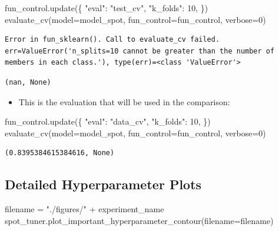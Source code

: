 \documentclass[
  letterpaper,
  DIV=11,
  numbers=noendperiod]{scrreprt}
\newenvironment{Shaded}{\begin{snugshade}}{\end{snugshade}}
\newcommand{\DecValTok}[1]{\textcolor[rgb]{0.68,0.00,0.00}{#1}}
\newcommand{\NormalTok}[1]{\textcolor[rgb]{0.00,0.23,0.31}{#1}}
\newcommand{\OperatorTok}[1]{\textcolor[rgb]{0.37,0.37,0.37}{#1}}
\newcommand{\StringTok}[1]{\textcolor[rgb]{0.13,0.47,0.30}{#1}}
\providecommand{\tightlist}{%
  \setlength{\itemsep}{0pt}\setlength{\parskip}{0pt}}\usepackage{longtable,booktabs,array}
\begin{document}
\begin{Shaded}
\begin{Highlighting}[]
\NormalTok{fun\_control.update(\{}
     \StringTok{"eval"}\NormalTok{: }\StringTok{"test\_cv"}\NormalTok{,}
     \StringTok{"k\_folds"}\NormalTok{: }\DecValTok{10}\NormalTok{,}
\NormalTok{\})}
\NormalTok{evaluate\_cv(model}\OperatorTok{=}\NormalTok{model\_spot, fun\_control}\OperatorTok{=}\NormalTok{fun\_control, verbose}\OperatorTok{=}\DecValTok{0}\NormalTok{)}
\end{Highlighting}
\end{Shaded}

\begin{verbatim}
Error in fun_sklearn(). Call to evaluate_cv failed. err=ValueError('n_splits=10 cannot be greater than the number of members in each class.'), type(err)=<class 'ValueError'>
\end{verbatim}

\begin{verbatim}
(nan, None)
\end{verbatim}

\begin{itemize}
\tightlist
\item
  This is the evaluation that will be used in the comparison:
\end{itemize}

\begin{Shaded}
\begin{Highlighting}[]
\NormalTok{fun\_control.update(\{}
     \StringTok{"eval"}\NormalTok{: }\StringTok{"data\_cv"}\NormalTok{,}
     \StringTok{"k\_folds"}\NormalTok{: }\DecValTok{10}\NormalTok{,}
\NormalTok{\})}
\NormalTok{evaluate\_cv(model}\OperatorTok{=}\NormalTok{model\_spot, fun\_control}\OperatorTok{=}\NormalTok{fun\_control, verbose}\OperatorTok{=}\DecValTok{0}\NormalTok{)}
\end{Highlighting}
\end{Shaded}

\begin{verbatim}
(0.8395384615384616, None)
\end{verbatim}

\hypertarget{detailed-hyperparameter-plots-2}{%
\subsection{Detailed Hyperparameter
Plots}\label{detailed-hyperparameter-plots-2}}

\begin{Shaded}
\begin{Highlighting}[]
\NormalTok{filename }\OperatorTok{=} \StringTok{"./figures/"} \OperatorTok{+}\NormalTok{ experiment\_name}
\NormalTok{spot\_tuner.plot\_important\_hyperparameter\_contour(filename}\OperatorTok{=}\NormalTok{filename)}
\end{Highlighting}
\end{Shaded}
\end{document}
